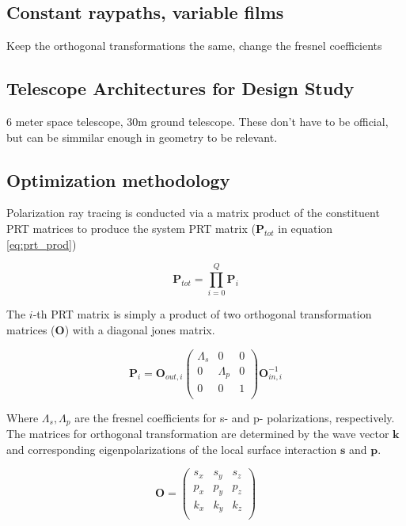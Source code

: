 \subsection{Constant raypaths, variable films}
Keep the orthogonal transformations the same, change the fresnel coefficients

\subsection{Telescope Architectures for Design Study}
6 meter space telescope, 30m ground telescope. These don't have to be official, but can be simmilar enough in geometry to be relevant.

\subsection{Optimization methodology}
Polarization ray tracing is conducted via a matrix product of the constituent PRT matrices to produce the system PRT matrix ($\mathbf{P}_{tot}$ in equation \ref{eq:prt_prod})

\begin{equation}
    \mathbf{P}_{tot} = \prod_{i=0}^{Q} \mathbf{P}_{i}
    \label{eq:prt_prod}
\end{equation}

The $i$-th PRT matrix is simply a product of two orthogonal transformation matrices ($\mathbf{O}$) with a diagonal jones matrix.

\begin{equation}
    \mathbf{P}_{i} = \mathbf{O}_{out,i} 
    \begin{pmatrix}
        \Lambda_{s} & 0 & 0 \\
        0 & \Lambda_{p} & 0 \\
        0 & 0 & 1 \\
    \end{pmatrix}
    \mathbf{O}_{in,i}^{-1}
\end{equation}

Where $\Lambda_{s},\Lambda_{p}$ are the fresnel coefficients for s- and p- polarizations, respectively. The matrices for orthogonal transformation are determined by the wave vector $\mathbf{k}$ and corresponding eigenpolarizations of the local surface interaction $\mathbf{s}$ and $\mathbf{p}$.

\begin{equation}
    \mathbf{O} = 
    \begin{pmatrix}
        s_{x} & s_{y} & s_{z} \\
        p_{x} & p_{y} & p_{z} \\
        k_{x} & k_{y} & k_{z} \\
    \end{pmatrix}
\end{equation}

